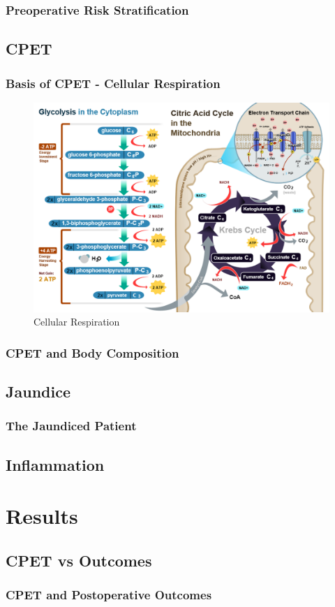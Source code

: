 \documentclass{beamer}
\begin{document}
\begin{frame}
	\frametitle{Preoperative Risk Stratification} 
	
\end{frame}

\subsection{CPET}

\begin{frame}
	\frametitle{Basis of CPET - Cellular Respiration} 
	\begin{figure}
		\centering
		\includegraphics[width=0.7\linewidth]{CellRespiration}
		\caption[Cellular Respiration]{Cellular Respiration}
		\label{fig:CellRespiration}
	\end{figure}
\end{frame}

\begin{frame}
	\frametitle{CPET and Body Composition}
\end{frame}

\subsection{Jaundice}

\begin{frame}
	\frametitle{The Jaundiced Patient}
\end{frame}

\subsection{Inflammation}


\section{Results}
\subsection{CPET vs Outcomes}
\begin{frame}
	\frametitle{CPET and Postoperative Outcomes}
\end{frame}
\end{document}
